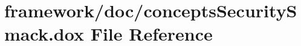 \hypertarget{concepts_security_smack_8dox}{}\section{framework/doc/concepts\+Security\+Smack.dox File Reference}
\label{concepts_security_smack_8dox}
